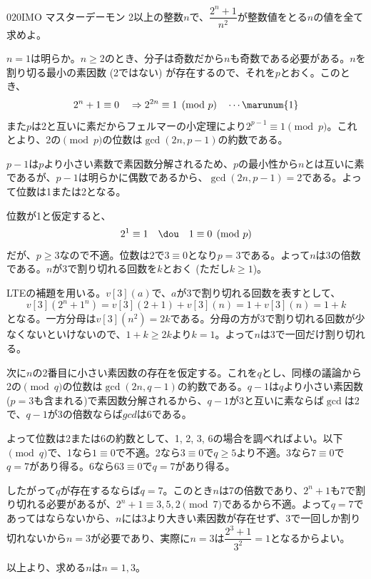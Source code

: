 \begin{prob}{020}{}{IMO マスターデーモン}
 2以上の整数$n$で、$\dfrac{2^n+1}{n^2}$が整数値をとる$n$の値を全て求めよ。 \\
\end{prob}
$n=1$は明らか。$n\ge 2$のとき、分子は奇数だから$n$も奇数である必要がある。$n$を割り切る最小の素因数 (2ではない) が存在するので、それを$p$とおく。このとき、
\[ 2^n+1\equiv 0 \quad\Rightarrow 2^{2n}\equiv 1 \pmod{p} \quad \cdots \marunum{1} \]
また$p$は2と互いに素だからフェルマーの小定理により$2^{p-1}\equiv 1 \pmod{p}$。これとより、2の$\pmod{p}$の位数は$\gcd(2n, p-1)$の約数である。

$p-1$は$p$より小さい素数で素因数分解されるため、$p$の最小性から$n$とは互いに素であるが、$p-1$は明らかに偶数であるから、$\gcd(2n, p-1)=2$である。よって位数は1または2となる。

位数が1と仮定すると、
\[ 2^1\equiv 1 \quad\dou\quad 1\equiv 0 \pmod{p} \]
だが、$p\ge 3$なので不適。位数は2で$3\equiv 0$となり$p=3$である。よって$n$は3の倍数である。$n$が3で割り切れる回数を$k$とおく (ただし$k\ge 1$)。

LTEの補題を用いる。$v[3](a)$で、$a$が3で割り切れる回数を表すとして、
\[ v[3](2^n+1^n)=v[3](2+1)+v[3](n)=1+v[3](n)=1+k \]
となる。一方分母は$v[3](n^2)=2k$である。分母の方が3で割り切れる回数が少なくないといけないので、$1+k\ge 2k$より$k=1$。よって$n$は3で一回だけ割り切れる。

次に$n$の2番目に小さい素因数の存在を仮定する。これを$q$とし、同様の議論から2の$\pmod{q}$の位数は$\gcd(2n, q-1)$の約数である。$q-1$は$q$より小さい素因数($p=3$も含まれる)で素因数分解されるから、$q-1$が3と互いに素ならば$\gcd$は2で、$q-1$が3の倍数ならば$gcd$は6である。

よって位数は2または6の約数として、1, 2, 3, 6の場合を調べればよい。以下$\pmod{q}$で、1なら$1\equiv 0$で不適。2なら$3\equiv 0$で$q\ge 5$より不適。3なら$7\equiv 0$で$q=7$があり得る。6なら$63\equiv 0$で$q=7$があり得る。

したがって$q$が存在するならば$q=7$。このとき$n$は7の倍数であり、$2^n+1$も7で割り切れる必要があるが、$2^n+1\equiv 3, 5, 2 \pmod{7}$であるから不適。よって$q=7$であってはならないから、$n$には3より大きい素因数が存在せず、3で一回しか割り切れないから$n=3$が必要であり、実際に$n=3$は$\dfrac{2^3+1}{3^2}=1$となるからよい。

以上より、求める$n$は$n=1, 3$。
